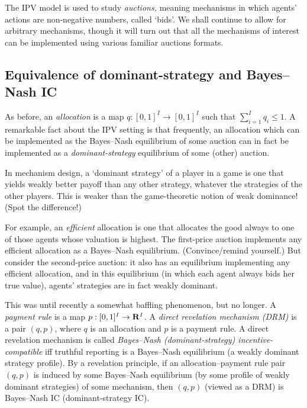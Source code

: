 The IPV model is used to study \emph{auctions,} meaning mechanisms in which agents' actions are non-negative numbers, called `bids'.
We shall continue to allow for arbitrary mechanisms, though
it will turn out that all the mechanisms of interest can be implemented using various familiar auctions formats.



\subsection{Equivalence of dominant-strategy and Bayes--Nash IC}
\label{sec::}

As before, an \emph{allocation} is a map $q : [0,1]^I \to [0,1]^I$ such that $\sum_{i=1}^I q_i \leq 1$.
A remarkable fact about the IPV setting is that frequently, an allocation which can be implemented as the Bayes--Nash equilibrium of some auction
can in fact be implemented as a \emph{dominant-strategy} equilibrium of some (other) auction.%

\begin{namedthm}
	\label{namedthm:dominance}
	In mechanism design, a `dominant strategy' of a player in a game is one that yields weakly better payoff than any other strategy, whatever the strategies of the other players.
	This is weaker than the game-theoretic notion of weak dominance!
	(Spot the difference!)
\end{namedthm}

For example, an \emph{efficient} allocation is one that allocates the good always to one of those agents whose valuation is highest.
The first-price auction implements any efficient allocation as a Bayes--Nash equilibrium. (Convince/remind yourself.)
But consider the second-price auction: it also has an equilibrium implementing any efficient allocation, and in this equilibrium (in which each agent always bids her true value), agents' strategies are in fact weakly dominant.

This was until recently a somewhat baffling phenomenon, but no longer.
A \emph{payment rule} is a map $p : [0,1]^I \to \mathbf{R}^I$.
A \emph{direct revelation mechanism (DRM)} is a pair $(q,p)$, where $q$ is an allocation and $p$ is a payment rule.
A direct revelation mechanism is called \emph{Bayes--Nash (dominant-strategy) incentive-compatible} iff truthful reporting is a Bayes--Nash equilibrium (a weakly dominant strategy profile).
By a revelation principle,
if an allocation--payment rule pair $(q,p)$ is
induced by some Bayes--Nash equilibrium (by some profile of weakly dominant strategies) of some mechanism,
then $(q,p)$ (viewed as a DRM) is Bayes--Nash IC (dominant-strategy IC).

